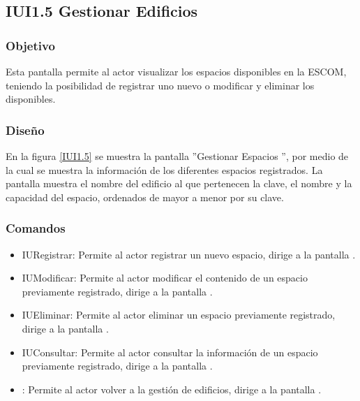 \subsection{IUI1.5 Gestionar Edificios}

\subsubsection{Objetivo}
	
Esta pantalla permite al actor visualizar los espacios disponibles en la ESCOM, teniendo la posibilidad de registrar uno nuevo o modificar y eliminar los disponibles.

\subsubsection{Diseño}

    En la figura \ref{IUI1.5} se muestra la pantalla ''Gestionar Espacios '', por medio de la cual se muestra la información de los diferentes espacios registrados. La pantalla muestra el nombre del edificio al que pertenecen la clave, el nombre y la capacidad del espacio, ordenados de mayor a menor por su clave.
 

\subsubsection{Comandos}
    \begin{itemize}
	\item IURegistrar: Permite al actor registrar un nuevo espacio, dirige a la pantalla .
	
	\item IUModificar: Permite al actor modificar el contenido de un espacio previamente registrado, dirige a la pantalla .
	
	\item IUEliminar: Permite al actor eliminar un espacio previamente registrado, dirige a la pantalla .

	\item IUConsultar: Permite al actor consultar la información de un espacio previamente registrado, dirige a la pantalla .

	\item {}: Permite al actor volver a la gestión de edificios, dirige a la pantalla .

	
    \end{itemize}
